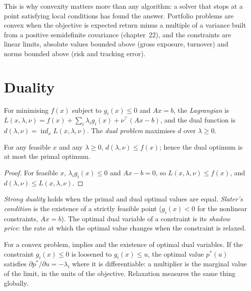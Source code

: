 This is why convexity matters more than any algorithm: a solver that stops at a point satisfying local conditions has found the answer. Portfolio problems are
convex when the objective is expected return minus a multiple of a variance built from a positive semidefinite covariance (chapter~22), and the constraints are
linear limits, absolute values bounded above (gross exposure, turnover) and norms bounded above (risk and tracking error).

\section{Duality}

\begin{definition}\label{def:qm:convex-optimisation:dual}
For minimising $f(x)$ subject to $g_i(x) \le 0$ and $Ax = b$, the \emph{Lagrangian} is $L(x, \lambda, \nu) = f(x) + \sum_i\lambda_ig_i(x) + \nu^\top(Ax
- b)$, and the dual function is $d(\lambda, \nu) = \inf_xL(x, \lambda, \nu)$. The \emph{dual problem} maximises $d$ over $\lambda \ge 0$.
\end{definition}

\begin{proposition}\label{prop:qm:convex-optimisation:weak}
For any feasible $x$ and any $\lambda \ge 0$, $d(\lambda, \nu) \le f(x)$; hence the dual optimum is at most the primal optimum.
\end{proposition}

\begin{proof}
For feasible $x$, $\lambda_ig_i(x) \le 0$ and $Ax - b = 0$, so $L(x, \lambda, \nu) \le f(x)$, and $d(\lambda, \nu) \le L(x, \lambda, \nu)$.
\end{proof}

\begin{definition}\label{def:qm:convex-optimisation:strong}
\emph{Strong duality} holds when the primal and dual optimal values are equal. \emph{Slater's condition} is the existence of a
strictly feasible point ($g_i(x) < 0$ for the nonlinear constraints, $Ax = b$). The optimal dual variable of a constraint is its \emph{shadow price}: the
rate at which the optimal value changes when the constraint is relaxed.
\end{definition}

For a convex problem,  implies  and the existence of optimal dual variables. If the constraint $g_i(x) \le 0$ is loosened to $g_i(x) \le u$,
the optimal value $p^*(u)$ satisfies $\partial p^*/\partial u = -\lambda_i$ where it is differentiable: a multiplier is the marginal value of the limit, in the units of the
objective. Relaxation measures the same thing globally.

